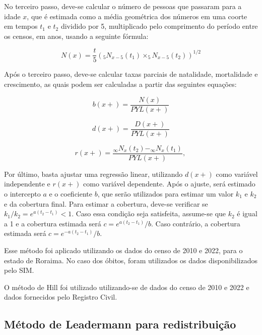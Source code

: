 \documentclass[
  12pt,
  a4paper,
]{scrreprt}
\begin{document}
No terceiro passo, deve-se calcular o número de pessoas que passaram
para a idade \(x\), que é estimada como a média geométrica dos números
em uma coorte em tempos \(t_{1}\) e \(t_{2}\) dividido por 5,
multiplicado pelo comprimento do período entre os censos, em anos,
usando a seguinte fórmula:

\[
N\left(x\right) = \frac{t}{5}\left(_{5}N_{x-5}\left(t_{1}\right)\times_{5}N_{x-5}\left(t_{2}\right)\right)^{1/2}
\]

\vspace{12pt}

Após o terceiro passo, deve-se calcular taxas parciais de natalidade,
mortalidade e crescimento, as quais podem ser calculadas a partir das
seguintes equações:

\[
b\left(x+\right) = \frac{N\left(x\right)}{PYL\left(x+\right)}
\]

\[
d\left(x+\right) = \frac{D\left(x+\right)}{PYL\left(x+\right)}
\]

\[
r\left(x+\right) = \frac{_{\infty}N_{x}\left(t_{2}\right) - _{\infty}N_{x}\left(t_{1}\right)}{PYL\left(x+\right)}\text{, }
\]

Por último, basta ajustar uma regressão linear, utilizando
\(d\left(x+\right)\) como variável independente e \(r\left(x+\right)\)
como variável dependente. Após o ajuste, será estimado o intercepto
\(a\) e o coeficiente \(b\), que serão utilizados para estimar um valor
\(k_{1}\) e \(k_{2}\) e da cobertura final. Para estimar a cobertura,
deve-se verificar se
\(k_{1}/k_{2} = e^{a\left(t_{2} - t_{1}\right)} < 1\). Caso essa
condição seja satisfeita, assume-se que \(k_{2}\) é igual a 1 e a
cobertura estimada será \(c = e^{a\left(t_{2} - t_{1}\right)} / b\).
Caso contrário, a cobertura estimada será
\(c = e^{-a\left(t_{2} - t_{1}\right)} / b\).

\vspace{12pt}

Esse método foi aplicado utilizando os dados do censo de 2010 e 2022,
para o estado de Roraima. No caso dos óbitos, foram utilizados os dados
disponibilizados pelo SIM.

\vspace{12pt}

O método de Hill foi utilizado utilizando-se de dados do censo de 2010 e
2022 e dados fornecidos pelo Registro Civil.

\subsection{Método de Leadermann para
redistribuição}\label{muxe9todo-de-leadermann-para-redistribuiuxe7uxe3o}
\end{document}
